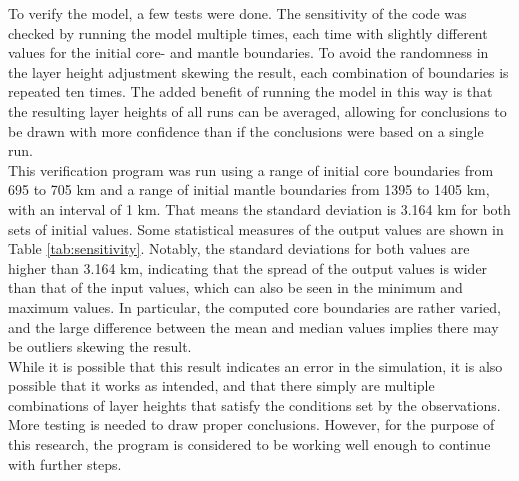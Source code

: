 \documentclass[twocolumn]{article}
\begin{document}
\indent To verify the model, a few tests were done. The sensitivity of the code was checked by running the model multiple times, each time with slightly different values for the initial core- and mantle boundaries. To avoid the randomness in the layer height adjustment skewing the result, each combination of boundaries is repeated ten times. The added benefit of running the model in this way is that the resulting layer heights of all runs can be averaged, allowing for conclusions to be drawn with more confidence than if the conclusions were based on a single run.\\
\indent This verification program was run using a range of initial core boundaries from 695 to 705 km and a range of initial mantle boundaries from 1395 to 1405 km, with an interval of 1 km. That means the standard deviation is 3.164 km for both sets of initial values. Some statistical measures of the output values are shown in Table \ref{tab:sensitivity}. Notably, the standard deviations for both values are higher than 3.164 km, indicating that the spread of the output values is wider than that of the input values, which can also be seen in the minimum and maximum values. In particular, the computed core boundaries are rather varied, and the large difference between the mean and median values implies there may be outliers skewing the result.\\
\indent While it is possible that this result indicates an error in the simulation, it is also possible that it works as intended, and that there simply are multiple combinations of layer heights that satisfy the conditions set by the observations. More testing is needed to draw proper conclusions. However, for the purpose of this research, the program is considered to be working well enough to continue with further steps.
\end{document}

